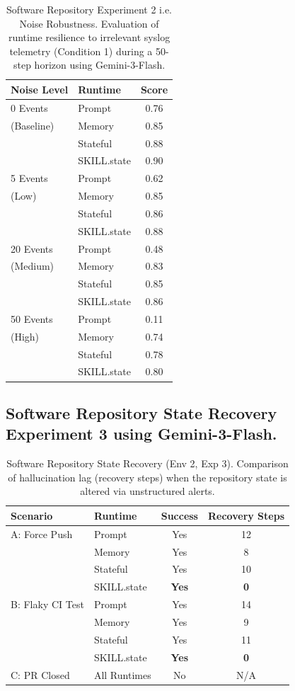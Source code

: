 \documentclass[11pt]{article}
\begin{document}
\begin{table}[h]
\centering
\caption{Software Repository Experiment 2 i.e. Noise Robustness. Evaluation of runtime resilience to irrelevant syslog telemetry (Condition 1) during a 50-step horizon using Gemini-3-Flash.}
\label{tab:env2_exp2_noise}
\begin{tabular}{llc}
\toprule
\textbf{Noise Level} & \textbf{Runtime} & \textbf{Score} \\
\midrule
0 Events & Prompt & 0.76 \\
(Baseline) & Memory & 0.85 \\
& Stateful & 0.88 \\
& SKILL.state & 0.90 \\
\midrule
5 Events & Prompt & 0.62 \\
(Low) & Memory & 0.85 \\
& Stateful & 0.86 \\
& SKILL.state & 0.88 \\
\midrule
20 Events & Prompt & 0.48 \\
(Medium) & Memory & 0.83 \\
& Stateful & 0.85 \\
& SKILL.state & 0.86 \\
\midrule
50 Events & Prompt & 0.11 \\
(High) & Memory & 0.74 \\
& Stateful & 0.78 \\
& SKILL.state & 0.80 \\
\bottomrule
\end{tabular}
\end{table}



\subsection{Software Repository State Recovery Experiment 3 using Gemini-3-Flash.}

\begin{table}[h]
\centering
\caption{Software Repository State Recovery (Env 2, Exp 3). Comparison of hallucination lag (recovery steps) when the repository state is altered via unstructured alerts.}
\label{tab:env2_exp3_recovery}
\begin{tabular}{llcc}
\toprule
\textbf{Scenario} & \textbf{Runtime} & \textbf{Success} & \textbf{Recovery Steps} \\
\midrule
A: Force Push & Prompt & Yes & 12 \\
& Memory & Yes & 8 \\
& Stateful & Yes & 10 \\
& SKILL.state & \textbf{Yes} & \textbf{0} \\
\midrule
B: Flaky CI Test & Prompt & Yes & 14 \\
& Memory & Yes & 9 \\
& Stateful & Yes & 11 \\
& SKILL.state & \textbf{Yes} & \textbf{0} \\
\midrule
C: PR Closed & All Runtimes & No & N/A \\
\bottomrule
\end{tabular}
\end{table}
\end{document}
